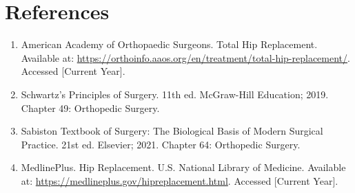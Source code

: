 \section*{References}
\begin{enumerate}
  \item American Academy of Orthopaedic Surgeons. Total Hip Replacement. Available at: \url{https://orthoinfo.aaos.org/en/treatment/total-hip-replacement/}. Accessed [Current Year].
  
  \item Schwartz's Principles of Surgery. 11th ed. McGraw-Hill Education; 2019. Chapter 49: Orthopedic Surgery.
  
  \item Sabiston Textbook of Surgery: The Biological Basis of Modern Surgical Practice. 21st ed. Elsevier; 2021. Chapter 64: Orthopedic Surgery.
  
  \item MedlinePlus. Hip Replacement. U.S. National Library of Medicine. Available at: \url{https://medlineplus.gov/hipreplacement.html}. Accessed [Current Year].
\end{enumerate}

\clearpage
